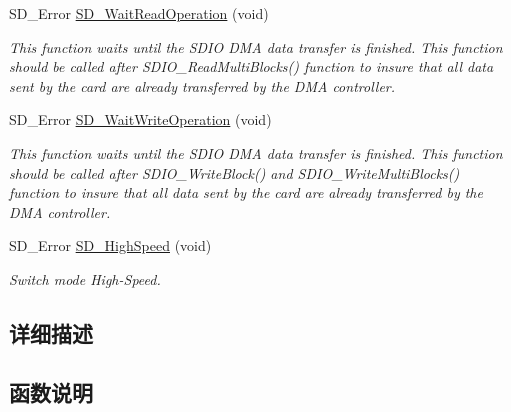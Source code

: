 \begin{DoxyCompactItemize}
S\+D\+\_\+\+Error \hyperlink{group___s_t_m324x_g___e_v_a_l___s_d_i_o___s_d___exported___functions_ga42ab410b834d74d7f3ee757dc888b8cc}{S\+D\+\_\+\+Wait\+Read\+Operation} (void)
\begin{DoxyCompactList}\small\item\em This function waits until the S\+D\+IO D\+MA data transfer is finished. This function should be called after S\+D\+I\+O\+\_\+\+Read\+Multi\+Blocks() function to insure that all data sent by the card are already transferred by the D\+MA controller. \end{DoxyCompactList}\item 
S\+D\+\_\+\+Error \hyperlink{group___s_t_m324x_g___e_v_a_l___s_d_i_o___s_d___exported___functions_gad55967ea67075f01671fb2144c7f7b0d}{S\+D\+\_\+\+Wait\+Write\+Operation} (void)
\begin{DoxyCompactList}\small\item\em This function waits until the S\+D\+IO D\+MA data transfer is finished. This function should be called after S\+D\+I\+O\+\_\+\+Write\+Block() and S\+D\+I\+O\+\_\+\+Write\+Multi\+Blocks() function to insure that all data sent by the card are already transferred by the D\+MA controller. \end{DoxyCompactList}\item 
S\+D\+\_\+\+Error \hyperlink{group___s_t_m324x_g___e_v_a_l___s_d_i_o___s_d___exported___functions_ga2457c748cf09c7ad5d3c9211d11e3fab}{S\+D\+\_\+\+High\+Speed} (void)
\begin{DoxyCompactList}\small\item\em Switch mode High-\/\+Speed. \end{DoxyCompactList}\end{DoxyCompactItemize}


\subsection{详细描述}


\subsection{函数说明}
